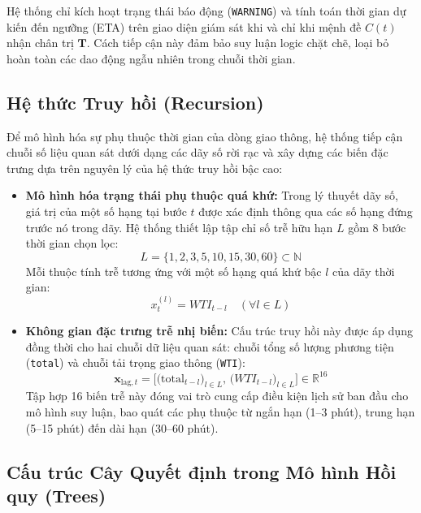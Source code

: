 Hệ thống chỉ kích hoạt trạng thái báo động (\texttt{WARNING}) và tính toán thời gian dự kiến đến ngưỡng (ETA) trên giao diện giám sát khi và chỉ khi mệnh đề $C(t)$ nhận chân trị $\mathbf{T}$. Cách tiếp cận này đảm bảo suy luận logic chặt chẽ, loại bỏ hoàn toàn các dao động ngẫu nhiên trong chuỗi thời gian.


\subsection{Hệ thức Truy hồi (Recursion)}
\label{subsec:recursion}

Để mô hình hóa sự phụ thuộc thời gian của dòng giao thông, hệ thống tiếp cận chuỗi số liệu quan sát dưới dạng các dãy số rời rạc và xây dựng các biến đặc trưng dựa trên nguyên lý của hệ thức truy hồi bậc cao:

\begin{itemize}
    \item \textbf{Mô hình hóa trạng thái phụ thuộc quá khứ:} 
    Trong lý thuyết dãy số, giá trị của một số hạng tại bước $t$ được xác định thông qua các số hạng đứng trước nó trong dãy. Hệ thống thiết lập tập chỉ số trễ hữu hạn $L$ gồm 8 bước thời gian chọn lọc:
    \begin{equation*}
        L = \{1, 2, 3, 5, 10, 15, 30, 60\} \subset \mathbb{N}
    \end{equation*}
    Mỗi thuộc tính trễ tương ứng với một số hạng quá khứ bậc $l$ của dãy thời gian:
    \begin{equation*}
        x_t^{(l)} = WTI_{t-l} \quad (\forall l \in L)
    \end{equation*}

    \item \textbf{Không gian đặc trưng trễ nhị biến:} 
    Cấu trúc truy hồi này được áp dụng đồng thời cho hai chuỗi dữ liệu quan sát: chuỗi tổng số lượng phương tiện (\texttt{total}) và chuỗi tải trọng giao thông (\texttt{WTI}):
    \begin{equation*}
        \mathbf{x}_{\text{lag}, t} = \Big[ \big(\text{total}_{t-l}\big)_{l \in L}, \, \big(WTI_{t-l}\big)_{l \in L} \Big] \in \mathbb{R}^{16}
    \end{equation*}
    Tập hợp 16 biến trễ này đóng vai trò cung cấp điều kiện lịch sử ban đầu cho mô hình suy luận, bao quát các phụ thuộc từ ngắn hạn (1--3 phút), trung hạn (5--15 phút) đến dài hạn (30--60 phút).
\end{itemize}

\subsection{Cấu trúc Cây Quyết định trong Mô hình Hồi quy (Trees)}
\label{subsec:trees}

